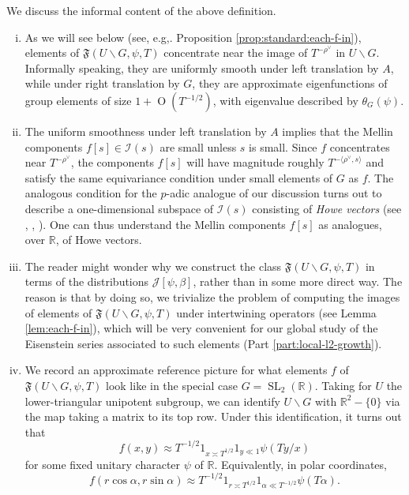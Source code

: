 \documentclass[reqno]{amsart}
\DeclareMathOperator{\SL}{SL}
\def\O{\operatorname{O}}
\theoremstyle{plain} \newtheorem{theorem} {Theorem}
\theoremstyle{definition} \newtheorem{definition} [theorem] {Definition}
\theoremstyle{itplain} %
\numberwithin{equation}{section}
\numberwithin{theorem}{section}
\begin{document}
\begin{remark}\label{rmk:we-discuss-informal-cal-F-U-G-T}
  We discuss the informal content of the above definition.
  \begin{enumerate}[(i)]
  \item 
  As we will see below (see, e.g,. Proposition \ref{prop:standard:each-f-in}), elements of $\mathfrak{F}(U \backslash G, \psi, T)$ concentrate near the image of $T^{-\rho^\vee}$ in $U \backslash G$.  Informally speaking, they are uniformly smooth under left translation by $A$, while under right translation by $G$, they are approximate eigenfunctions of group elements of size $1 + \O(T^{-1/2})$, with eigenvalue described by $\theta_G(\psi)$.
\item The uniform smoothness under left translation by $A$ implies that the Mellin components $f[s] \in \mathcal{I}(s)$ are small unless $s$ is small.  Since $f$ concentrates near $T^{-\rho^\vee}$, the components $f[s]$ will have magnitude roughly $T^{- \langle \rho^\vee, s \rangle}$ and satisfy the same equivariance condition under small elements of $G$ as $f$.  The analogous condition for the $p$-adic analogue of our discussion turns out to describe a one-dimensional subspace of $\mathcal{I}(s)$ consisting of \emph{Howe vectors} (see \cite[\S5]{MR2016587}, \cite[\S7.1]{MR2192818}, \cite[\S5]{MR3683106}).  One can thus understand the Mellin components $f[s]$ as analogues, over $\mathbb{R}$, of Howe vectors.
\item The reader might wonder why we construct the class $\mathfrak{F}(U \backslash G, \psi, T)$ in terms of the distributions $\mathcal{J}[\psi,\beta]$, rather than in some more direct way.  The reason is that by doing so, we trivialize the problem of computing the images of elements of $\mathfrak{F}(U \backslash G, \psi, T)$ under intertwining operators (see Lemma \ref{lem:each-f-in}), which will be very convenient for our global study of the Eisenstein series associated to such elements (Part \ref{part:local-l2-growth}).
\item 
  We record an approximate reference picture for what elements $f$ of $\mathfrak{F}(U \backslash G, \psi, T)$ look like in the special case $G = \SL_2(\mathbb{R})$.    Taking for $U$ the lower-triangular unipotent subgroup, we can identify $U \backslash G$ with $\mathbb{R}^2 - \{0\}$ via the map taking a matrix to its top row.  Under this identification, it turns out that
  \begin{equation*}
    f(x,y) \approx
    T^{-1/2}
    1_{x \asymp T^{1/2}}
    1_{y \ll 1}
    \psi(T y/x)
  \end{equation*}
  for some fixed unitary character $\psi$ of $\mathbb{R}$.  Equivalently, in polar coordinates,
  \begin{equation*}
    f(r \cos \alpha, r \sin \alpha) \approx
    T^{-1/2} 1_{r \asymp T^{1/2}}
    1 _{\alpha \ll T^{-1/2}} \psi(T \alpha).
  \end{equation*}
\end{enumerate}
\end{remark}
\end{document}
